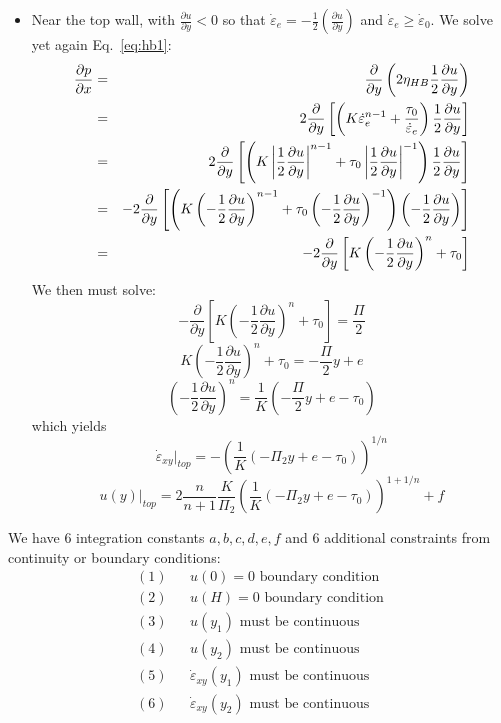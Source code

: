 \begin{itemize}
\item Near the top wall, with $\frac{\partial u}{\partial y}<0$ so that 
$\dot{\varepsilon}_{e} = -\frac{1}{2}\left( \frac{\partial u}{\partial y}  \right)$ 
and $\dot{\varepsilon}_e\geq \dot{\varepsilon}_0$. We solve yet again Eq.~\eqref{eq:hb1}:
\begin{eqnarray}
\frac{\partial p}{\partial x}  
&=&\frac{\partial }{\partial y} \left( 2 \eta_{HB}  \frac{1}{2}\frac{\partial u}{\partial y} \right)  \nonumber\\
&=&2 \frac{\partial }{\partial y} \left[  
\left( K  \dot{\varepsilon}_e^{n-1} + \frac{\tau_0}{\dot{\varepsilon}_e}  
\right) \frac{1}{2}\frac{\partial u}{\partial y} \right] \nonumber\\
&=&2\frac{\partial }{\partial y} \left[  
\left( K \left|\frac{1}{2}\frac{\partial u}{\partial y}\right|^{n-1} 
+ \tau_0 \left|\frac{1}{2}\frac{\partial u}{\partial y}\right|^{-1} 
\right) \frac{1}{2}\frac{\partial u}{\partial y} \right]  \nonumber\\
&=&-2\frac{\partial }{\partial y} \left[  
\left( K \left( - \frac{1}{2}\frac{\partial u}{\partial y}\right)^{n-1} 
+ \tau_0 \left( -\frac{1}{2}\frac{\partial u}{\partial y}\right)^{-1} 
\right) \left(-\frac{1}{2}\frac{\partial u}{\partial y}\right) \right]  \nonumber\\
&=& -2\frac{\partial }{\partial y} \left[   
K \left(-\frac{1}{2}\frac{\partial u}{\partial y}\right)^{n} + \tau_0 \right] 
\end{eqnarray}
We then must solve:
\[
-\frac{\partial }{\partial y} \left[ 
K \left(-\frac{1}{2}\frac{\partial u}{\partial y}\right)^{n} + \tau_0 \right] 
= \frac{\Pi}{2}
\]
\[
K \left(-\frac{1}{2}\frac{\partial u}{\partial y}\right)^{n} + \tau_0 = - \frac{\Pi}{2} y + e
\]
\[
 \left(-\frac{1}{2}\frac{\partial u}{\partial y}\right)^{n}  = \frac{1}{K} (-\frac{\Pi}{2} y + e - \tau_0)
\]
which yields
\[
\boxed{
\dot{\varepsilon}_{xy}|_{top}
=  - \left( \frac{1}{K} (- \Pi_2 y +e - \tau_0 ) \right)^{1/n}
}
\]
\[
\boxed{
u(y)|_{top} = 2 \frac{n}{n+1} \frac{K}{\Pi_2} \left( \frac{1}{K} ( -\Pi_2 y +e -\tau_0 ) \right)^{1+1/n} + f
}
\]


\end{itemize}

\newpage

We have 6 integration constants $a,b,c,d,e,f$ and 6 additional constraints from 
continuity or boundary conditions:
\begin{eqnarray}
(1)&&u(0) = 0 \text{ boundary condition}\\
(2)&&u(H) = 0 \text{ boundary condition}\\
(3)&&u(y_1) \text{ must be continuous}\\
(4)&&u(y_2) \text{ must be continuous}\\
(5)&&\dot{\varepsilon}_{xy}(y_1) \text{ must be continuous}\\
(6)&&\dot{\varepsilon}_{xy}(y_2) \text{ must be continuous}
\end{eqnarray}

